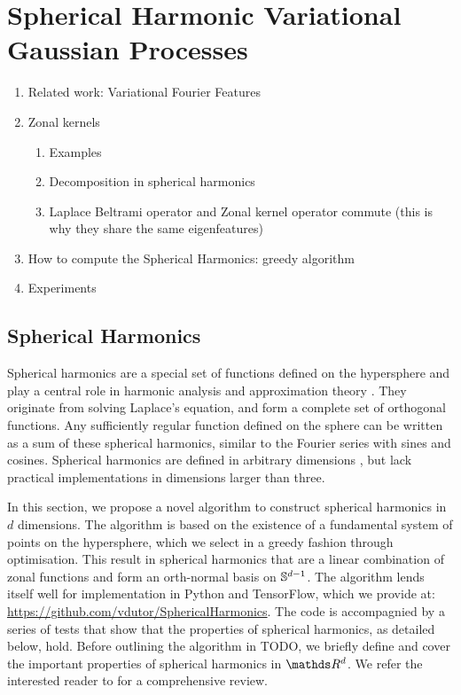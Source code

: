 \chapter{Spherical Harmonic Variational Gaussian Processes}

\begin{enumerate}
    \item Related work: Variational Fourier Features
    \item Zonal kernels
    \begin{enumerate}
        \item Examples
        \item Decomposition in spherical harmonics
        \item Laplace Beltrami operator and Zonal kernel operator commute (this is why they share the same eigenfeatures)
    \end{enumerate}
    \item How to compute the Spherical Harmonics: greedy algorithm
    \item Experiments
\end{enumerate}


\section{Spherical Harmonics}

Spherical harmonics are a special set of functions defined on the hypersphere and play a central role in harmonic analysis and approximation theory \citep{wendland2005}. They originate from solving Laplace's equation, and form a complete set of orthogonal functions. Any sufficiently regular function defined on the sphere can be written as a sum of these spherical harmonics, similar to the Fourier series with sines and cosines. Spherical harmonics are defined in arbitrary dimensions \citep{frye2014,dai2013}, but lack practical implementations in dimensions larger than three. %

In this section, we propose a novel algorithm to construct spherical harmonics in $d$ dimensions. The algorithm is based on the existence of a fundamental system of points on the hypersphere, which we select in a greedy fashion through optimisation. This result in spherical harmonics that are a linear combination of zonal functions and form an orth-normal basis on $\mathbb{S}^{d-1}$. The algorithm lends itself well for implementation in Python and TensorFlow, which we provide at: \url{https://github.com/vdutor/SphericalHarmonics}. The code is accompagnied by a series of tests that show that the properties of spherical harmonics, as detailed below, hold. Before outlining the algorithm in TODO, we briefly define and cover the important properties of spherical harmonics in $\Reals^d$. We refer the interested reader to \citet{dai2013,frye2014} for a comprehensive review.

